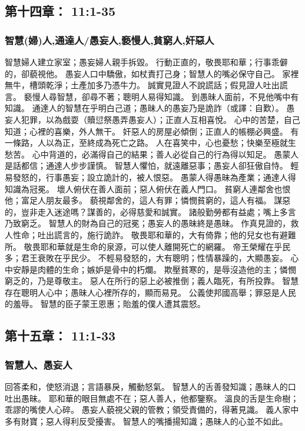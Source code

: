 \subsection{第十四章：   11:1-35}
\subsubsection{智慧(婦)人,通達人/愚妄人,褻慢人,貧窮人,奸惡人}
智慧婦人建立家室；愚妄婦人親手拆毀。
行動正直的，敬畏耶和華；行事乖僻的，卻藐視他。
愚妄人口中驕傲，如杖責打己身；智慧人的嘴必保守自己。
家裡無牛，槽頭乾淨；土產加多乃憑牛力。
誠實見證人不說謊話；假見證人吐出謊言。
褻慢人尋智慧，卻尋不著；聰明人易得知識。
到愚昧人面前，不見他嘴中有知識。
通達人的智慧在乎明白己道；愚昧人的愚妄乃是詭詐（或譯：自歎）。
愚妄人犯罪，以為戲耍（贖愆祭愚弄愚妄人）；正直人互相喜悅。
心中的苦楚，自己知道；心裡的喜樂，外人無干。
奸惡人的房屋必傾倒；正直人的帳棚必興盛。
有一條路，人以為正，至終成為死亡之路。
人在喜笑中，心也憂愁；快樂至極就生愁苦。
心中背道的，必滿得自己的結果；善人必從自己的行為得以知足。
愚蒙人是話都信；通達人步步謹慎。
智慧人懼怕，就遠離惡事；愚妄人卻狂傲自恃。
輕易發怒的，行事愚妄；設立詭計的，被人恨惡。
愚蒙人得愚昧為產業；通達人得知識為冠冕。
壞人俯伏在善人面前；惡人俯伏在義人門口。
貧窮人連鄰舍也恨他；富足人朋友最多。
藐視鄰舍的，這人有罪；憐憫貧窮的，這人有福。
謀惡的，豈非走入迷途嗎？謀善的，必得慈愛和誠實。
諸般勤勞都有益處；嘴上多言乃致窮乏。
智慧人的財為自己的冠冕；愚妄人的愚昧終是愚昧。
作真見證的，救人性命；吐出謊言的，施行詭詐。
敬畏耶和華的，大有倚靠；他的兒女也有避難所。
敬畏耶和華就是生命的泉源，可以使人離開死亡的網羅。
帝王榮耀在乎民多；君王衰敗在乎民少。
不輕易發怒的，大有聰明；性情暴躁的，大顯愚妄。
心中安靜是肉體的生命；嫉妒是骨中的朽爛。
欺壓貧寒的，是辱沒造他的主；憐憫窮乏的，乃是尊敬主。
惡人在所行的惡上必被推倒；義人臨死，有所投靠。
智慧存在聰明人心中；愚昧人心裡所存的，顯而易見。
公義使邦國高舉；罪惡是人民的羞辱。
智慧的臣子蒙王恩惠；貽羞的僕人遭其震怒。

\subsection{第十五章：   11:1-33}
\subsubsection{智慧人、愚妄人 }
回答柔和，使怒消退；言語暴戾，觸動怒氣。
智慧人的舌善發知識；愚昧人的口吐出愚昧。
耶和華的眼目無處不在；惡人善人，他都鑒察。
溫良的舌是生命樹；乖謬的嘴使人心碎。
愚妄人藐視父親的管教；領受責備的，得著見識。
義人家中多有財寶；惡人得利反受擾害。
智慧人的嘴播揚知識；愚昧人的心並不如此。

